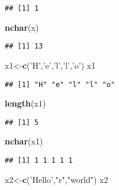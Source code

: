 \documentclass[]{article}
\newenvironment{Shaded}{\begin{snugshade}}{\end{snugshade}}
\newcommand{\KeywordTok}[1]{\textcolor[rgb]{0.13,0.29,0.53}{\textbf{#1}}}
\newcommand{\NormalTok}[1]{#1}
\newcommand{\StringTok}[1]{\textcolor[rgb]{0.31,0.60,0.02}{#1}}
\begin{document}
\begin{verbatim}
## [1] 1
\end{verbatim}

\begin{Shaded}
\begin{Highlighting}[]
\KeywordTok{nchar}\NormalTok{(x)}
\end{Highlighting}
\end{Shaded}

\begin{verbatim}
## [1] 13
\end{verbatim}

\begin{Shaded}
\begin{Highlighting}[]
\NormalTok{x1<-}\KeywordTok{c}\NormalTok{(}\StringTok{'H'}\NormalTok{,}\StringTok{'e'}\NormalTok{,}\StringTok{'l'}\NormalTok{,}\StringTok{'l'}\NormalTok{,}\StringTok{'o'}\NormalTok{)}
\NormalTok{x1}
\end{Highlighting}
\end{Shaded}

\begin{verbatim}
## [1] "H" "e" "l" "l" "o"
\end{verbatim}

\begin{Shaded}
\begin{Highlighting}[]
\KeywordTok{length}\NormalTok{(x1)}
\end{Highlighting}
\end{Shaded}

\begin{verbatim}
## [1] 5
\end{verbatim}

\begin{Shaded}
\begin{Highlighting}[]
\KeywordTok{nchar}\NormalTok{(x1)}
\end{Highlighting}
\end{Shaded}

\begin{verbatim}
## [1] 1 1 1 1 1
\end{verbatim}

\begin{Shaded}
\begin{Highlighting}[]
\NormalTok{x2<-}\KeywordTok{c}\NormalTok{(}\StringTok{'Hello'}\NormalTok{,}\StringTok{"r"}\NormalTok{,}\StringTok{"world"}\NormalTok{)}
\NormalTok{x2}
\end{Highlighting}
\end{Shaded}
\end{document}
